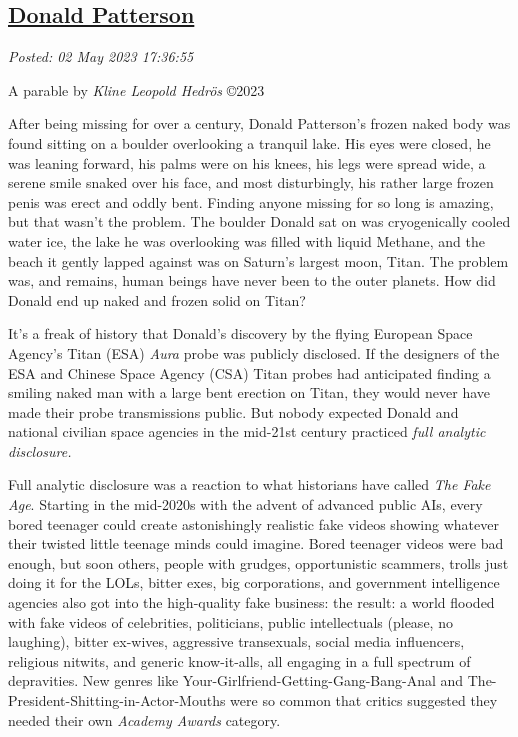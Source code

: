 %

\subsection*{\href{http://analyzethedatanotthedrivel.org/2023/05/02/donald-patterson/}{Donald Patterson}}


\noindent\emph{Posted: 02 May 2023 17:36:55}
\vspace{6pt}

A parable by \emph{Kline Leopold Hedrös} ©2023

After being missing for over a century, Donald Patterson's frozen naked
body was found sitting on a boulder overlooking a tranquil lake. His
eyes were closed, he was leaning forward, his palms were on his knees,
his legs were spread wide, a serene smile snaked over his face, and most
disturbingly, his rather large frozen penis was erect and oddly bent.
Finding anyone missing for so long is amazing, but that wasn't the
problem. The boulder Donald sat on was cryogenically cooled water ice,
the lake he was overlooking was filled with liquid Methane, and the
beach it gently lapped against was on Saturn's largest moon, Titan. The
problem was, and remains, human beings have never been to the outer
planets. How did Donald end up naked and frozen solid on Titan?

It's a freak of history that Donald's discovery by the flying European
Space Agency's Titan (ESA) \emph{Aura} probe was publicly disclosed. If
the designers of the ESA and Chinese Space Agency (CSA) Titan probes had
anticipated finding a smiling naked man with a large bent erection on
Titan, they would never have made their probe transmissions public. But
nobody expected Donald and national civilian space agencies in the
mid-21st century practiced \emph{full analytic disclosure.}

Full analytic disclosure was a reaction to what historians have called
\emph{The Fake Age}. Starting in the mid-2020s with the advent of
advanced public AIs, every bored teenager could create astonishingly
realistic fake videos showing whatever their twisted little teenage
minds could imagine. Bored teenager videos were bad enough, but soon
others, people with grudges, opportunistic scammers, trolls just doing
it for the LOLs, bitter exes, big corporations, and government
intelligence agencies also got into the high-quality fake business: the
result: a world flooded with fake videos of celebrities, politicians,
public intellectuals (please, no laughing), bitter ex-wives, aggressive
transexuals, social media influencers, religious nitwits, and generic
know-it-alls, all engaging in a full spectrum of depravities. New genres
like Your-Girlfriend-Getting-Gang-Bang-Anal and
The-President-Shitting-in-Actor-Mouths were so common that critics
suggested they needed their own \emph{Academy Awards} category.

